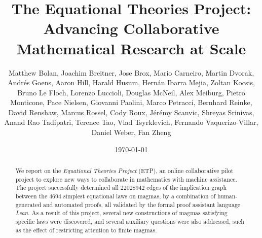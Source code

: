 \documentclass[12pt]{amsart}
\title[Equational Theories Project]{The Equational Theories Project: Advancing Collaborative Mathematical Research at Scale}
\author[Equational Theories Project contributors]{Matthew Bolan, Joachim Breitner, Jose Brox, Mario Carneiro,
  Martin Dvorak, Andr\'es Goens, Aaron Hill, Harald Husum, Hern\'an Ibarra Mejia, Zoltan Kocsis, Bruno Le Floch, Lorenzo Luccioli, Douglas McNeil,
  Alex Meiburg, Pietro Monticone, Pace Nielsen, Giovanni Paolini, Marco Petracci, Bernhard Reinke, David Renshaw, Marcus Rossel, Cody Roux,
  J\'er\'emy Scanvic, Shreyas Srinivas, Anand Rao Tadipatri, Terence Tao, Vlad Tsyrklevich, Fernando Vaquerizo-Villar,
  Daniel Weber, Fan Zheng}
\date{\today}
\theoremstyle{definition}
\begin{document}
\begin{abstract}
  We report on the \emph{Equational Theories Project} (ETP), an online collaborative pilot project
  to explore new ways to collaborate in mathematics with machine assistance. The project successfully determined all $\num{22028942}$ edges of the implication graph between the $4694$ simplest equational laws on magmas, by a combination of
  human-generated and automated proofs, all validated by the formal proof assistant language
  \emph{Lean}. As a result of this project, several new constructions of magmas satisfying specific laws were discovered, and several auxiliary questions were also addressed, such as the effect of restricting attention to finite magmas.
\end{abstract}

\maketitle

{
\setlength{\parskip}{0em}
\tableofcontents
}








% 







\appendix







\listoftodos{}
\end{document}
